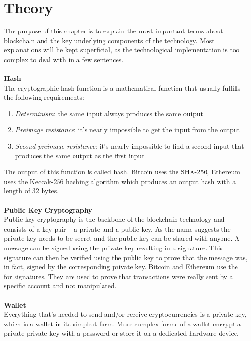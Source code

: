 \section{Theory}
The purpose of this chapter is to explain the most important terms about blockchain and the key underlying components of the technology. Most explanations will be kept superficial, as the technological implementation is too complex to deal with in a few sentences.
\\\\

\textbf{Hash}\\
The cryptographic hash function is a mathematical function that usually fulfills the following requirements\cite{hash}:
\begin{enumerate}
    \item \textit{Determinism}: the same input always produces the same output
    \item \textit{Preimage resistance}: it's nearly impossible to get the input from the output
    \item \textit{Second-preimage resistance}: it's nearly impossible to find a second input that produces the same output as the first input
\end{enumerate}
The output of this function is called hash. Bitcoin uses the SHA-256\cite{bitcoin-whitepaper}, Ethereum uses the Keccak-256\cite{ethereum-yellow-paper} hashing algorithm which produces an output hash with a length of 32 bytes.
\\\\

\textbf{Public Key Cryptography}\\
Public key cryptography\cite{public-key-cryptography} is the backbone of the blockchain technology and consists of a key pair – a private and a public key. As the name suggests the private key needs to be secret and the public key can be shared with anyone. A message can be signed using the private key resulting in a signature. This signature can then be verified using the public key to prove that the message was, in fact, signed by the corresponding private key. Bitcoin and Ethereum use the  for signatures. They are used to prove that transactions were really sent by a specific account and not manipulated.
\\\\

\textbf{Wallet}\\
Everything that's needed to send and/or receive cryptocurrencies is a private key\cite{bitcoin-whitepaper}, which is a wallet in its simplest form. More complex forms of a wallet encrypt a private private key with a password or store it on a dedicated hardware device.
\\\\

